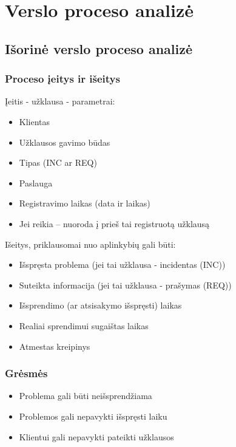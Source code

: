 \section{Verslo proceso analizė}

	\subsection{Išorinė verslo proceso analizė}

		\subsubsection{Proceso įeitys ir išeitys}

			Įeitis - užklausa - parametrai:
			\begin{itemize}
				\item Klientas
				\item Užklausos gavimo būdas
				\item Tipas (INC ar REQ)
				\item Paslauga
				\item Registravimo laikas (data ir laikas)
				\item Jei reikia – nuoroda į prieš tai registruotą užklausą
			\end{itemize}

			Išeitys, priklausomai nuo aplinkybių gali būti:
			\begin{itemize}
				\item Išspręsta problema (jei tai užklausa - incidentas (INC))
				\item Suteikta informacija (jei tai užklausa - prašymas (REQ))
				\item Išsprendimo (ar atsisakymo išspręsti) laikas
				\item Realiai sprendimui sugaištas laikas
				\item Atmestas kreipinys
			\end{itemize}

		\subsubsection{Grėsmės}
			\begin{itemize}
				\item Problema gali būti neišsprendžiama
				\item Problemos gali nepavykti išspręsti laiku
				\item Klientui gali nepavykti pateikti užklausos
			\end{itemize}
			
